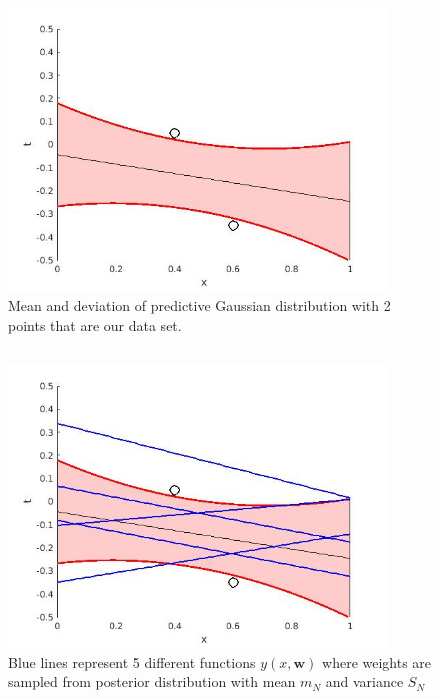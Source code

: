 \documentclass{article}
\begin{document}
\begin{figure}[htb]
\centering
\includegraphics[width=10cm]{ex1_2.jpg}
\caption{Mean and deviation of predictive Gaussian distribution with 2 points that are our data set.}
\label{fig:meandev}
\end{figure}

\subsection{}

\begin{figure}[htb]
\centering
\includegraphics[width=10cm]{ex1_3.jpg}
\caption{Blue lines represent 5 different functions $y(x,\textbf{w})$ where weights are sampled from posterior distribution with mean $m_N$ and variance $S_N$}
\label{fig:pos}
\end{figure}
\end{document}
